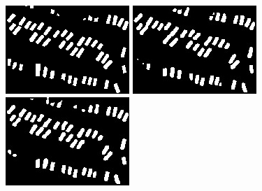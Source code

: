 \documentclass{kththesis}
\begin{document}
\begin{figure}[H]
  \includegraphics[width=\linewidth]{class_vs_w/label_2}
\endminipage\hfill
{}
  \includegraphics[width=\linewidth]{class_vs_w/un_weight_2}
\endminipage\hfill
{}%
  \includegraphics[width=\linewidth]{class_vs_w/weight_2}
\endminipage
\caption{}
\end{figure}
\end{document}
